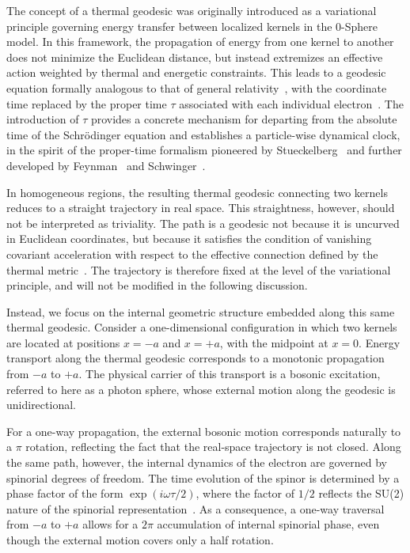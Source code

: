 \documentclass[%
 reprint,
 amsmath,amssymb,
 aps,
 prb,
]{revtex4-2}
\numberwithin{equation}{section}
\begin{document}
The concept of a thermal geodesic was originally introduced as a variational principle governing energy transfer between localized kernels in the 0-Sphere model. In this framework, the propagation of energy from one kernel to another does not minimize the Euclidean distance, but instead extremizes an effective action weighted by thermal and energetic constraints. This leads to a geodesic equation formally analogous to that of general relativity~\cite{misner1973,wald1984}, with the coordinate time replaced by the proper time $\tau$ associated with each individual electron~\cite{bjorken1964,ryder1996}. The introduction of $\tau$
provides a concrete mechanism for departing from the
absolute time of the Schr\"odinger equation and establishes
a particle-wise dynamical clock, in the spirit of the
proper-time formalism pioneered by Stueckelberg~\cite{stueckelberg1941}
and further developed by Feynman~\cite{feynman1949}
and Schwinger~\cite{schwinger1951}.

In homogeneous regions, the resulting thermal geodesic connecting two kernels reduces to a straight trajectory in real space. This straightness, however, should not be interpreted as triviality. The path is a geodesic not because it is uncurved in Euclidean coordinates, but because it satisfies the condition of vanishing covariant acceleration with respect to the effective connection defined by the thermal metric~\cite{wald1984,weinberg1972}. The trajectory is therefore fixed at the level of the variational principle, and will not be modified in the following discussion.

Instead, we focus on the internal geometric structure embedded along this same thermal geodesic. Consider a one-dimensional configuration in which two kernels are located at positions $x=-a$ and $x=+a$, with the midpoint at $x=0$. Energy transport along the thermal geodesic corresponds to a monotonic propagation from $-a$ to $+a$. The physical carrier of this transport is a bosonic excitation, referred to here as a photon sphere, whose external motion along the geodesic is unidirectional.

For a one-way propagation, the external bosonic motion corresponds naturally to a $\pi$ rotation, reflecting the fact that the real-space trajectory is not closed. Along the same path, however, the internal dynamics of the electron are governed by spinorial degrees of freedom. The time evolution of the spinor is determined by a phase factor of the form $\exp(i\omega \tau/2)$, where the factor of $1/2$ reflects the SU(2) nature of the spinorial representation~\cite{wigner1939,sakurai2017,shankar2016}. As a consequence, a one-way traversal from $-a$ to $+a$ allows for a $2\pi$ accumulation of internal spinorial phase, even though the external motion covers only a half rotation.
\end{document}

